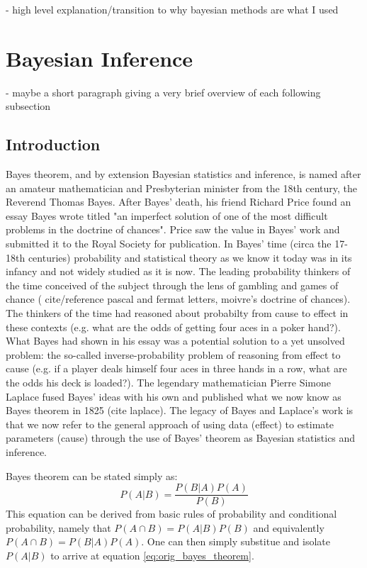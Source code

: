 - high level explanation/transition to why bayesian methods are what I used

\section{Bayesian Inference}

- maybe a short paragraph giving a very brief overview of each following subsection

\subsection{Introduction}

Bayes theorem, and by extension Bayesian statistics and inference, is named after an amateur mathematician and Presbyterian minister from the 18th century, the Reverend Thomas Bayes. After Bayes' death, his friend Richard Price found an essay Bayes wrote titled "an imperfect solution of one of the most difficult problems in the doctrine of chances". Price saw the value in Bayes' work and submitted it to the Royal Society for publication. In Bayes' time (circa the 17-18th centuries) probability and statistical theory as we know it today was in its infancy and not widely studied as it is now. The leading probability thinkers of the time conceived of the subject through the lens of gambling and games of chance ( cite/reference pascal and fermat letters, moivre's doctrine of chances). The thinkers of the time had reasoned about probabilty from cause to effect in these contexts (e.g. what are the odds of getting four aces in a poker hand?). What Bayes had shown in his essay was a potential solution to a yet unsolved problem: the so-called inverse-probability problem of reasoning from effect to cause (e.g. if a player deals himself four aces in three hands in a row, what are the odds his deck is loaded?). The legendary mathematician Pierre Simone Laplace fused Bayes' ideas with his own and published what we now know as Bayes theorem in 1825 (cite laplace). The legacy of Bayes and Laplace's work is that we now refer to the general approach of using data (effect) to estimate parameters (cause) through the use of Bayes' theorem as Bayesian statistics and inference.

Bayes theorem can be stated simply as:
\begin{equation} \label{eq:orig_bayes_theorem}
P(A|B) = \frac{P(B|A)P(A)}{P(B)}
\end{equation}
This equation can be derived from basic rules of probability and conditional probability, namely that $P(A \cap B) = P(A|B)P(B)$ and equivalently $P(A \cap B) = P(B|A)P(A)$. One can then simply substitue and isolate $P(A|B)$ to arrive at equation \ref{eq:orig_bayes_theorem}.

